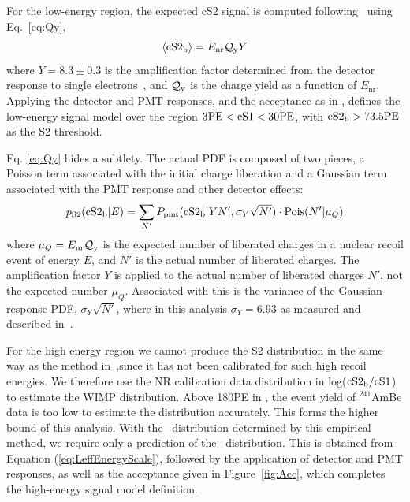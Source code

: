 For the low-energy region, the expected cS2 signal is computed following~\cite{DataMCXenon} using Eq.~\ref{eq:Qy},
%
\begin{equation}
\label{eq:Qy}
	\langle \mathrm{cS2}_\mathrm{b} \rangle = E_{\mathrm{nr}}\mathcal{Q}_{\mathrm{y}} Y   
\end{equation}
%
where $Y = 8.3 \pm 0.3$ 
is the amplification factor determined from the detector response to single electrons~\cite{XenonSingleElectron}, and $\mathcal{Q}_{\mathrm{y}}$ is the charge yield as a function of $E_\mathrm{nr}$. Applying the detector and PMT responses, and the acceptance as in \cite{xe100_run_combination}, defines the low-energy signal model over the region $3 \mathrm{PE} < \mathrm{cS1} < 30 \mathrm{PE}$, with $\mathrm{cS2}_\mathrm{b} > 73.5 \mathrm{PE}$ as the S2 threshold.

Eq. \ref{eq:Qy} hides a subtlety. The actual \cSiib PDF is composed of two pieces, a Poisson term associated with the initial charge liberation and a Gaussian term associated with the PMT response and other detector effects:
%
\begin{equation}
\label{eq.cS2pdf}
p_\mathrm{S2}(\mathrm{\mathrm{cS2}_\mathrm{b}}|E) = \sum_{N'} P_\mathrm{pmt}(\mathrm{\mathrm{cS2}_\mathrm{b}}|Y N',\sigma_Y \sqrt{N'})\cdot\mathrm{Pois}(N'|\mu_Q)
\end{equation}
%
where $\mu_Q=E_{\mathrm{nr}}\mathcal{Q}_{\mathrm{y}}$ is the expected number of liberated charges in a nuclear recoil event of energy $E$, and $N'$ is the actual number of liberated charges. The amplification factor $Y$ is applied to the actual number of liberated charges $N'$, not the expected number $\mu_Q$. Associated with this is the variance of the Gaussian response PDF, $\sigma_Y\sqrt{N'}$, where in this analysis $\sigma_Y = 6.93$ as measured and described in~\cite{XenonSingleElectron}. 

For the high energy region we cannot produce the S2 distribution in the same way as the method in~\cite{DataMCXenon},since it  has not been calibrated for such high recoil energies. We therefore use the NR calibration data distribution in log($\mathrm{\mathrm{cS2}_\mathrm{b}/\mathrm{cS1}}$) to estimate the WIMP distribution. Above 180PE in \cSi, the event yield of $^{241}$AmBe data is too low to estimate the distribution accurately. This forms the higher bound of this analysis. With the \cSiib\ distribution determined by this empirical method, we require only a prediction of the \cSi\ distribution. This is obtained from Equation (\ref{eq:LeffEnergyScale}), followed by the application of detector and PMT responses, as well as the acceptance given in Figure~\ref{fig:Acc}, which completes the high-energy signal model definition.

